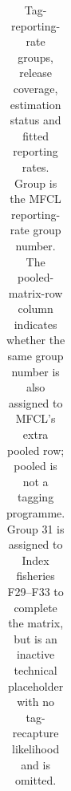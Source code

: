 \documentclass[
  english,
  a4paper,
  a4paper,
  11pt]{SCreport}
\begin{document}
\clearpage

\begin{landscape}
\begingroup
\fontsize{6.2}{6.35}\selectfont
\setlength{\tabcolsep}{3pt}
\renewcommand{\arraystretch}{0.90}

\begin{longtable}{@{}>{\raggedright\arraybackslash}p{0.045\linewidth}>{\raggedright\arraybackslash}p{0.105\linewidth}>{\raggedright\arraybackslash}p{0.075\linewidth}>{\raggedright\arraybackslash}p{0.125\linewidth}>{\raggedright\arraybackslash}p{0.09\linewidth}>{\raggedright\arraybackslash}p{0.215\linewidth}>{\raggedright\arraybackslash}p{0.065\linewidth}>{\raggedleft\arraybackslash}p{0.065\linewidth}@{}}

\caption{\label{tbl-tag-definitions}Tag-reporting-rate groups, release coverage, estimation status and fitted reporting rates. Group is the MFCL reporting-rate group number. The pooled-matrix-row column indicates whether the same group number is also assigned to MFCL's extra pooled row; pooled is not a tagging programme. Group 31 is assigned to Index fisheries F29--F33 to complete the matrix, but is an inactive technical placeholder with no tag-recapture likelihood and is omitted.}

\tabularnewline


\end{longtable}
\end{landscape}
\end{document}
